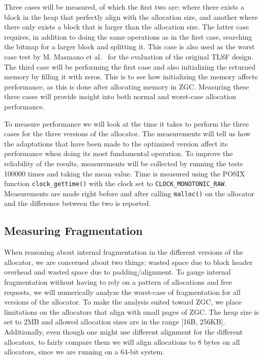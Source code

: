 Three cases will be measured, of which the first two are: where there exists a block in the heap that perfectly align with the allocation size, and another where there only exists a block that is larger than the allocation size. The latter case requires, in addition to doing the same operations as in the first case, searching the bitmap for a larger block and splitting it. This case is also used as the worst case test by M. Masmano et al.~\cite{TLSF} for the evaluation of the original TLSF design. The third case will be performing the first case and also initializing the returned memory by filling it with zeros. This is to see how initializing the memory affects performance, as this is done after allocating memory in ZGC. Measuring these three cases will provide insight into both normal and worst-case allocation performance.

To measure performance we will look at the time it takes to perform the three cases for the three versions of the allocator. The measurements will tell us how the adaptations that have been made to the optimized version affect its performance when doing its most fundamental operation. To improve the reliability of the results, measurements will be collected by running the tests 100000 times and taking the mean value. Time is measured using the POSIX function \texttt{clock\_gettime()} with the clock set to \texttt{CLOCK\_MONOTONIC\_RAW}. Measurements are made right before and after calling \texttt{malloc()} on the allocator and the difference between the two is reported.

\subsection{Measuring Fragmentation}

When reasoning about internal fragmentation in the different versions of the allocator, we are concerned about two things: wasted space due to block header overhead and wasted space due to padding/alignment. To gauge internal fragmentation without having to rely on a pattern of allocations and free requests, we will numerically analyze the worst-case of fragmentation for all versions of the allocator. To make the analysis suited toward ZGC, we place limitations on the allocators that align with small pages of ZGC. The heap size is set to 2MB and allowed allocation sizes are in the range [16B, 256KB]. Additionally, even though one might use different alignment for the different allocators, to fairly compare them we will align allocations to 8 bytes on all allocators, since we are running on a 64-bit system.

